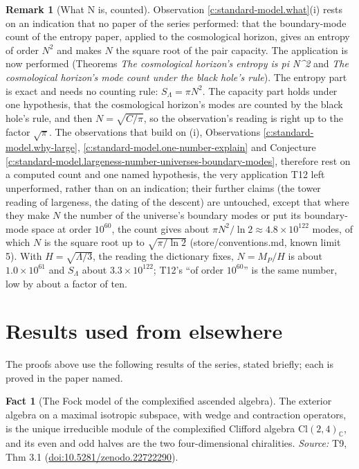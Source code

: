 \documentclass[11pt]{article}
\theoremstyle{definition}
\newtheorem{fact}[theorem]{Fact}
\newtheorem{remark}[theorem]{Remark}
\theoremstyle{plain}
\newcommand{\changedmark}[2]{\marginpar{\raggedright\scriptsize\color{#1}#2}}
\providecommand{\C}{}\renewcommand{\C}{\mathbb{C}}
\providecommand{\Cl}{}\renewcommand{\Cl}{\mathrm{Cl}}
\begin{document}
\begin{remark}[What N is, counted]\label{c:note.synthesis.what-n-is-counted}
\changedmark{MidnightBlue}{added since the deposit}
Observation \ref{c:standard-model.what}(i) rests on an indication that no paper of the series performed: that the boundary-mode count of the entropy paper, applied to the cosmological horizon, gives an entropy of order $N^{2}$ and makes $N$ the square root of the pair capacity. The application is now performed (Theorems \emph{The cosmological horizon's entropy is pi N\^{}2} and \emph{The cosmological horizon's mode count under the black hole's rule}). The entropy part is exact and needs no counting rule: $S_{\Lambda} = \pi N^{2}$. The capacity part holds under one hypothesis, that the cosmological horizon's modes are counted by the black hole's rule, and then $N = \sqrt{C/\pi}$, so the observation's reading is right up to the factor $\sqrt{\pi}$. The observations that build on (i), Observations \ref{c:standard-model.why-large}, \ref{c:standard-model.one-number-explain} and Conjecture \ref{c:standard-model.largeness-number-universes-boundary-modes}, therefore rest on a computed count and one named hypothesis, the very application T12 left unperformed, rather than on an indication; their further claims (the tower reading of largeness, the dating of the descent) are untouched, except that where they make $N$ the number of the universe's boundary modes or put its boundary-mode space at order $10^{60}$, the count gives about $\pi N^{2}/\ln 2 \approx 4.8 \times 10^{122}$ modes, of which $N$ is the square root up to $\sqrt{\pi/\ln 2}$ (store/conventions.md, known limit 5). With $H = \sqrt{\Lambda/3}$, the reading the dictionary fixes, $N = M_{P}/H$ is about $1.0 \times 10^{61}$ and $S_{\Lambda}$ about $3.3 \times 10^{122}$; T12's ``of order $10^{60}$'' is the same number, low by about a factor of ten.
\end{remark}

\section{Results used from elsewhere}
The proofs above use the following results of the series, stated briefly; each is proved in the paper named.

\begin{fact}[The Fock model of the complexified ascended algebra]\label{c:correspondence.fock-model-complexified-ascended-algebra}
The exterior algebra on a maximal isotropic subspace, with wedge and contraction operators, is the unique irreducible module of the complexified Clifford algebra $\Cl(2,4)_\C$, and its even and odd halves are the two four-dimensional chiralities.
\emph{Source:} T9, Thm 3.1 (\href{https://doi.org/10.5281/zenodo.22722290}{doi:10.5281/zenodo.22722290}).
\end{fact}
\end{document}
